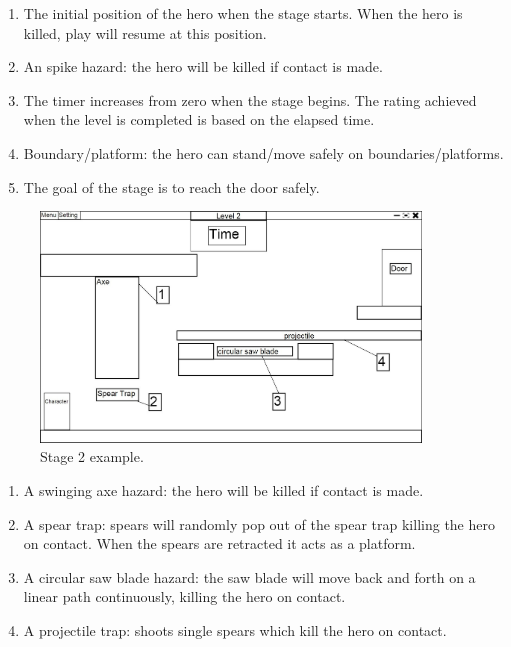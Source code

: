 \documentclass[12pt, titlepage]{article}
\begin{document}
\begin{enumerate}
  \item The initial position of the hero when the stage starts. When the hero is killed, play will resume at this position.
  \item An spike hazard: the hero will be killed if contact is made.
  \item The timer increases from zero when the stage begins.  The rating achieved when the level is completed is based on the elapsed time.
  \item Boundary/platform:  the hero can stand/move safely on boundaries/platforms.
  \item The goal of the stage is to reach the door safely.
\end{enumerate}

\newpage

\begin{figure}[hTB]
\begin{center}
\includegraphics[width=0.90\textwidth]{stage2}
\caption{Stage 2 example.} \label{fig:stage2}
\end{center}
\end{figure}


\begin{enumerate}
  \item A swinging axe hazard: the hero will be killed if contact is made.
  \item A spear trap: spears will randomly pop out of the spear trap killing the hero on contact.  When the spears are retracted it acts as a platform.
  \item A circular saw blade hazard: the saw blade will move back and forth on a linear path continuously, killing the hero on contact.
  \item A projectile trap: shoots single spears which kill the hero on contact.
\end{enumerate}
\end{document}
